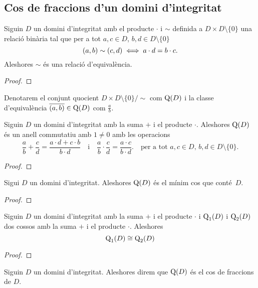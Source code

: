 \documentclass[../../Main.tex]{subfiles}
\begin{document}
	\subsection{Cos de fraccions d'un domini d'integritat}
	\begin{proposition}
		\label{prop:relació d'equivalència cos de fraccions}
		Siguin \(D\) un domini d'integritat amb el producte \(\cdot\) i \(\sim\) definida a \(D\times D\setminus\{0\}\) una relació binària tal que per a tot \(a,c\in D\), \(b,d\in D\setminus\{0\}\) 
		\[(a,b)\sim(c,d)\iff a\cdot d=b\cdot c.\]
		Aleshores \(\sim\) és una relació d'equivalència.
		\begin{proof}
		\end{proof}
	\end{proposition}
	\begin{notation}
		Denotarem el conjunt quocient \(D\times D\setminus\{0\}/\sim\) com \(\operatorname{Q}(D)\) i la classe d'equivalència \(\overline{(a,b)}\in\operatorname{Q}(D)\) com \(\frac{a}{b}\).
	\end{notation}
	\begin{lemma}
		\label{lema:cos de fraccions}
		Siguin \(D\) un domini d'integritat amb la suma \(+\) i el producte \(\cdot\). Aleshores \(\operatorname{Q}(D)\) és un anell commutatiu amb \(1\neq0\) amb les operacions
		\[\frac{a}{b}+\frac{c}{d}=\frac{a\cdot d+c\cdot b}{b\cdot d}\quad\text{i}\quad\frac{a}{b}\cdot\frac{c}{d}=\frac{a\cdot c}{b\cdot d}.\quad\text{per a tot }a,c\in D\text{, }b,d\in D\setminus\{0\}.\]
		\begin{proof}
		\end{proof}
	\end{lemma}
	\begin{theorem}
		\label{thm:cos de fraccions}
		Sigui \(D\) un domini d'integritat. Aleshores \(\operatorname{Q}(D)\) és el mínim cos que conté~\(D\).
		\begin{proof}
		\end{proof}
	\end{theorem}
	\begin{theorem}
		\label{thm:unicitat del cos de fraccions d'un domini}
		Siguin \(D\) un domini d'integritat amb la suma \(+\) i el producte \(\cdot\) i \(\operatorname{Q}_{1}(D)\) i \(\operatorname{Q}_{2}(D)\) dos cossos  amb la suma \(+\) i el producte \(\cdot\). Aleshores
		\[\operatorname{Q}_{1}(D)\cong\operatorname{Q}_{2}(D)\]
		\begin{proof}
		\end{proof}
	\end{theorem}
	\begin{definition}
		\label{def:cos de fraccions}
		Siguin \(D\) un domini d'integritat. Aleshores direm que \(\operatorname{Q}(D)\) és el cos de fraccions de \(D\).
	\end{definition}
\end{document}
